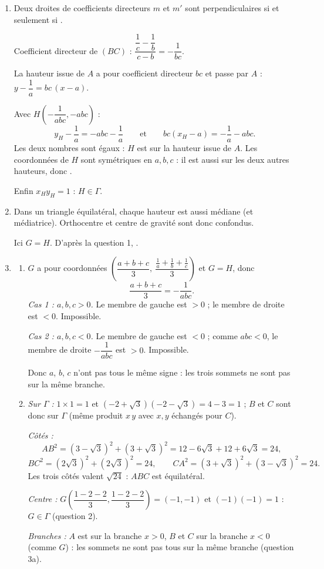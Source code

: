 \begin{enumerate}[itemsep=14pt]
  \item\leavevmode
  \begin{prop}[Perpendicularité]
  Deux droites de coefficients directeurs $m$ et $m'$ sont perpendiculaires si et seulement si .
  \end{prop}
  Coefficient directeur de $(BC)$ : $\dfrac{\dfrac1c-\dfrac1b}{c-b}=-\dfrac1{bc}$.

  La hauteur issue de $A$ a pour coefficient directeur $bc$ et passe par $A$ : $y-\dfrac1a=bc\,(x-a)$.

  Avec $H\left(-\dfrac1{abc},-abc\right)$ :
  \[y_H-\dfrac1a=-abc-\dfrac1a\qquad\text{et}\qquad bc(x_H-a)=-\dfrac1a-abc.\]
  Les deux nombres sont égaux : $H$ est sur la hauteur issue de $A$. Les coordonnées de $H$ sont symétriques en $a,b,c$ : il est aussi sur les deux autres hauteurs, donc .

  Enfin $x_Hy_H=1$ : $H\in\Gamma$.

  \item\leavevmode
  \begin{prop}
  Dans un triangle équilatéral, chaque hauteur est aussi médiane (et médiatrice). Orthocentre et centre de gravité sont donc confondus.
  \end{prop}
  Ici $G=H$. D'après la question 1, .

  \item
  \begin{enumerate}[itemsep=8pt]
    \item $G$ a pour coordonnées $\left(\dfrac{a+b+c}3,\ \dfrac{\frac1a+\frac1b+\frac1c}3\right)$ et $G=H$, donc
    \[\dfrac{a+b+c}{3}=-\dfrac{1}{abc}.\]
    \emph{Cas 1 : $a,b,c>0$.} Le membre de gauche est $>0$ ; le membre de droite est $<0$. Impossible.

    \emph{Cas 2 : $a,b,c<0$.} Le membre de gauche est $<0$ ; comme $abc<0$, le membre de droite $-\dfrac1{abc}$ est $>0$. Impossible.

    Donc $a$, $b$, $c$ n'ont pas tous le même signe : les trois sommets ne sont pas sur la même branche.
    \item \emph{Sur $\Gamma$ :} $1\times1=1$ et $(-2+\sqrt3)(-2-\sqrt3)=4-3=1$ ; $B$ et $C$ sont donc sur $\Gamma$ (même produit $x\,y$ avec $x,y$ échangés pour $C$).

    \emph{Côtés :}
    \[AB^2=(3-\sqrt3)^2+(3+\sqrt3)^2=12-6\sqrt3+12+6\sqrt3=24,\]
    \[BC^2=(2\sqrt3)^2+(2\sqrt3)^2=24,\qquad CA^2=(3+\sqrt3)^2+(3-\sqrt3)^2=24.\]
    Les trois côtés valent $\sqrt{24}$ : $ABC$ est équilatéral.

    \emph{Centre :} $G\left(\dfrac{1-2-2}{3},\dfrac{1-2-2}{3}\right)=(-1,-1)$ et $(-1)(-1)=1$ : $G\in\Gamma$ (question 2).

    \emph{Branches :} $A$ est sur la branche $x>0$, $B$ et $C$ sur la branche $x<0$ (comme $G$) : les sommets ne sont pas tous sur la même branche (question 3a).
  \end{enumerate}
\end{enumerate}

